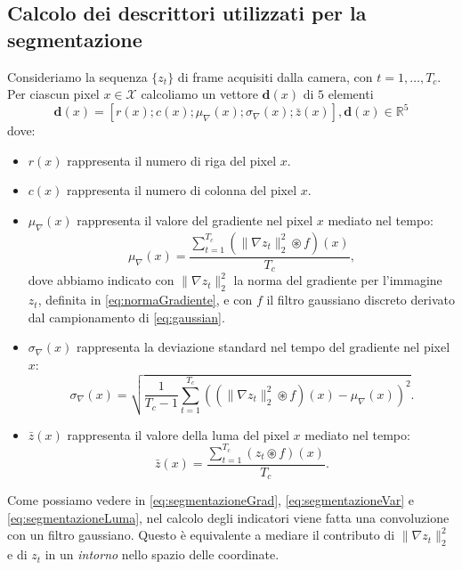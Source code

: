 \subsection{Calcolo dei descrittori utilizzati per la segmentazione}
\label{descrittori}
Consideriamo la sequenza $\{z_t\}$ di frame acquisiti dalla camera, con $t=1,\dots,T_{c}$.
Per ciascun pixel $x\in\mathcal{X}$ calcoliamo un vettore $\textbf{d}(x)$ di $5$ elementi
\begin{equation}
	\label{eq:featureVector}
	\textbf{d}(x)=\left[r(x);c(x);\mu_{\nabla}(x);\sigma_{\nabla}(x);\bar{z}(x)\right], \textbf{d}(x) \in \mathbb{R}^5
\end{equation}
dove:
\begin{itemize}
	\item $r(x)$ rappresenta il numero di riga del pixel $x$.
	\item $c(x)$ rappresenta il numero di colonna del pixel $x$.
	\item $\mu_{\nabla}(x)$ rappresenta il valore del gradiente nel pixel $x$ mediato nel tempo:
	\begin{equation}
	\label{eq:segmentazioneGrad}
		\mu_{\nabla}(x) = \frac{\sum_{t=1}^{T_c}(\|\nabla z_t\|_2^2 \circledast f)(x)}{T_c},
	\end{equation}
	dove abbiamo indicato con $\|\nabla z_t\|_2^2$ la norma del gradiente per l'immagine $z_t$, definita in \eqref{eq:normaGradiente}, e con $f$ il filtro gaussiano discreto derivato dal campionamento di \eqref{eq:gaussian}.
	\item $\sigma_{\nabla}(x)$ rappresenta la deviazione standard nel tempo del gradiente nel pixel $x$:
	\begin{equation}
		\label{eq:segmentazioneVar}
		\sigma_{\nabla}(x)=\sqrt{\frac{1}{T_c - 1}\sum_{t=1}^{T_c}\left(\left(\|\nabla z_t\|_2^2 \circledast f\right)(x)-\mu_{\nabla}(x)\right)^2}.
	\end{equation}
	\item $\bar{z}(x)$ rappresenta il valore della luma del pixel $x$ mediato nel tempo:
	\begin{equation}
	\label{eq:segmentazioneLuma}
	\bar{z}(x)=\frac{\sum_{t=1}^{T_c}( z_t \circledast f)(x)}{T_c}.
	\end{equation}
\end{itemize}
Come possiamo vedere in \eqref{eq:segmentazioneGrad}, \eqref{eq:segmentazioneVar} e \eqref{eq:segmentazioneLuma}, nel calcolo degli indicatori viene fatta una convoluzione con un filtro gaussiano.
Questo \`e equivalente a mediare il contributo di $\|\nabla z_t\|_2^2$ e di $z_t$ in un \textit{intorno} nello spazio delle coordinate.\\
